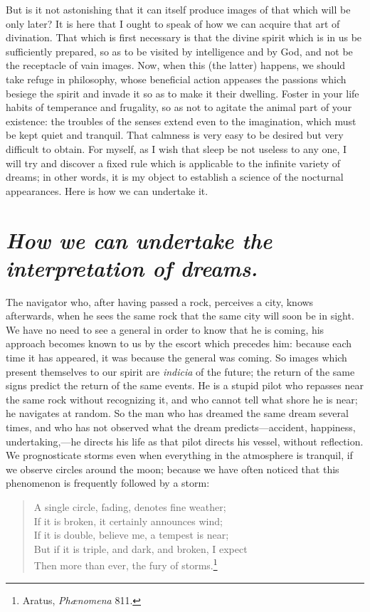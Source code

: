 \documentclass[12pt]{article}
\begin{document}
But is it not astonishing that it can itself produce images of that which will
be only later? It is here that I ought to speak of how we can acquire that art
of divination. That which is first necessary is that the divine spirit which is
in us be sufficiently prepared, so as to be visited by intelligence and by God,
and not be the receptacle of vain images. Now, when this (the latter) happens,
we should take refuge in philosophy, whose beneficial action appeases the
passions which besiege the spirit and invade it so as to make it their
dwelling. Foster in your life habits of temperance and frugality, so as not to
agitate the animal part of your existence: the troubles of the senses extend
even to the imagination, which must be kept quiet and tranquil. That calmness
is very easy to be desired but very difficult to obtain. For myself, as I wish
that sleep be not useless to any one, I will try and discover a fixed rule
which is applicable to the infinite variety of dreams; in other words, it is my
object to establish a science of the nocturnal appearances. Here is how we can
undertake it.


\section{\mdseries\itshape How we can undertake the interpretation of dreams.}

The navigator who, after having passed a rock, perceives a city, knows
afterwards, when he sees the same rock that the same city will soon be in
sight. We have no need to see a general in order to know that he is coming, his
approach becomes known to us by the escort which precedes him: because each
time it has appeared, it was because the general was coming. So images which
present themselves to our spirit are \textit{indicia} of the future; the
return of the same signs predict the return of the same events. He is a stupid
pilot who repasses near the same rock without recognizing it, and who cannot
tell what shore he is near; he navigates at random. So the man who has dreamed
the same dream several times, and who has not observed what the dream
predicts---accident, happiness, undertaking,---he directs his life as that pilot
directs his vessel, without reflection. We prognosticate storms even when
everything in the atmosphere is tranquil, if we observe circles around the
moon; because we have often noticed that this phenomenon is frequently followed
by a storm:

\begin{verse}
A single circle, fading, denotes fine weather;\\
If it is broken, it certainly announces wind;\\
If it is double, believe me, a tempest is near;\\
But if it is triple, and dark, and broken, I expect\\
Then more than ever, the fury of storms.\footnote{Aratus,
\textit{Ph{\ae}nomena} 811.}
\end{verse}
\end{document}
